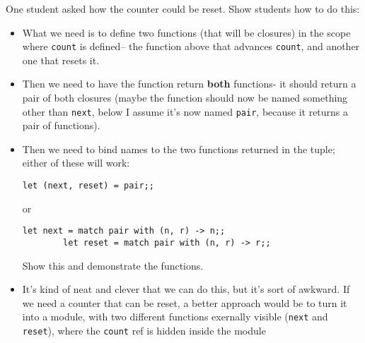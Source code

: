 \documentclass[12pt]{article}
\begin{document}
        \vspace{-1mm}

        One student asked how the counter could be reset.  Show students how
      to do this:

        \vspace{-2.5mm}

        \begin{itemize}

          \addtolength{\itemsep}{0mm}

          \item What we need is to define two functions (that will be
                closures) in the scope where \texttt{count} is defined-- the
                function above that advances \texttt{count}, and another one
                that resets it.

          \item Then we need to have the function return \textbf{both}
                functions- it should return a pair of both closures (maybe
                the function should now be named something other than
                \texttt{next}, below I assume it's now named \texttt{pair},
                because it returns a pair of functions).

          \item Then we need to bind names to the two functions returned in
                the tuple; either of these will work:

                \begin{Verbatim}[xleftmargin=1.5in]
        let (next, reset) = pair;;
                \end{Verbatim}

                \vspace{-2mm}

                or

                \vspace{-3mm}

                \begin{Verbatim}[xleftmargin=1.5in]
        let next = match pair with (n, r) -> n;;
        let reset = match pair with (n, r) -> r;;
                \end{Verbatim}

                Show this and demonstrate the functions.

          \item It's kind of neat and clever that we can do this, but it's
                sort of awkward.  If we need a counter that can be reset, a
                better approach would be to turn it into a module, with two
                different functions exernally visible (\texttt{next} and
                \texttt{reset}), where the \texttt{count} ref is hidden
                inside the module


\end{itemize}
\end{document}
